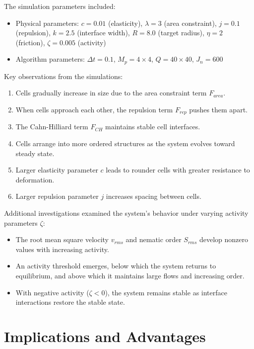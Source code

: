 \documentclass[11pt]{article}
\begin{document}
The simulation parameters included:
\begin{itemize}
    \item Physical parameters: $c = 0.01$ (elasticity), $\lambda = 3$ (area constraint), $j = 0.1$ (repulsion), $k = 2.5$ (interface width), $R = 8.0$ (target radius), $\eta = 2$ (friction), $\zeta = 0.005$ (activity)
    \item Algorithm parameters: $\Delta t = 0.1$, $M_p = 4 \times 4$, $Q = 40 \times 40$, $J_n = 600$
\end{itemize}

Key observations from the simulations:

\begin{enumerate}
    \item Cells gradually increase in size due to the area constraint term $F_{area}$.
    \item When cells approach each other, the repulsion term $F_{rep}$ pushes them apart.
    \item The Cahn-Hilliard term $F_{CH}$ maintains stable cell interfaces.
    \item Cells arrange into more ordered structures as the system evolves toward steady state.
    \item Larger elasticity parameter $c$ leads to rounder cells with greater resistance to deformation.
    \item Larger repulsion parameter $j$ increases spacing between cells.
\end{enumerate}

Additional investigations examined the system's behavior under varying activity parameters $\zeta$:

\begin{itemize}
    \item The root mean square velocity $v_{rms}$ and nematic order $S_{rms}$ develop nonzero values with increasing activity.
    \item An activity threshold emerges, below which the system returns to equilibrium, and above which it maintains large flows and increasing order.
    \item With negative activity ($\zeta < 0$), the system remains stable as interface interactions restore the stable state.
\end{itemize}

\section{Implications and Advantages}
\end{document}
